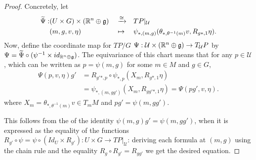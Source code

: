 \begin{proof}
Concretely, let
\begin{align*}
    \Tilde \Psi :& (U \times G) \times (\RR^n \oplus \alg g) && \xrightarrow{\cong} && TP|_{\mathcal U} \\    
                 & (m, g, v, \eta)&& \mapsto &&\psi_{*, (m, g)}(\theta_{*, \theta^{-1}(m)} v, R_{g*, 1} \eta).
\end{align*}
Now, define the coordinate map for $TP/G$ $\Psi : \mathcal U \times (\mathbb{R}^n \oplus \mathfrak{g})  \to  T_{\mathcal U}P$ by $\Psi = \widetilde \Psi \circ (\psi^{-1} \times id_{\mathbb{R}^n \oplus \mathfrak{g}})$. %
The equivariance of this chart %
 means that for any $p \in \mathcal U$, which can be written as $p = \psi(m, g)$ for some $m \in M$ and $g \in G$,
\begin{align*}
    \Psi(p, v, \eta) g' &=R_{g'*, p} \circ \psi_{*, p}(X_m, R_{g*, 1} \eta)\\
    &= \psi_{*, (m, gg')}(X_m, R_{gg'*, 1} \eta) = \Psi(pg', v, \eta).
\end{align*} where $X_m = \theta_{*, \theta^{-1}(m)} v \in T_m M$ and $pg' = \psi(m, gg')$.

This follows from the of the identity $\psi(m, g) g' = \psi(m, gg')$, when it is expressed as the equality of the functions $R_{g'} \circ \psi = \psi \circ (Id_U \times R_{g'}) : U \times G \to TP|_{\mathcal U}$: deriving each formula at $(m, g)$ using the chain rule and the equality $R_g \circ R_{g'} = R_{gg'}$ we get the desired equation.%


\end{proof}
